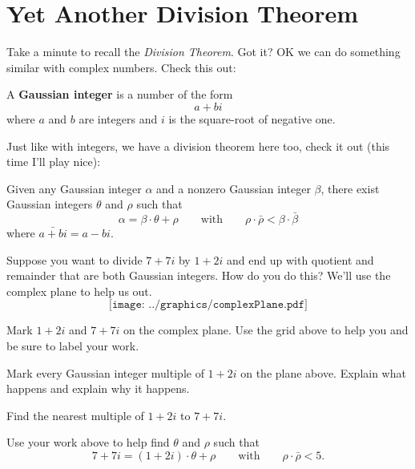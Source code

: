 \newpage
\section{Yet Another Division Theorem}\label{gaussianInt}


Take a minute to recall the \textit{Division Theorem}. Got it? OK we
can do something similar with complex numbers. Check this out:

\begin{definition} 
A \textbf{Gaussian integer} is a number of the form
\[
a + bi
\]
where $a$ and $b$ are integers and $i$ is the square-root of negative
one.
\end{definition}

Just like with integers, we have a division theorem here too, check it
out (this time I'll play nice):

\begin{theorem}
Given any Gaussian integer $\alpha$ and a nonzero Gaussian integer
$\beta$, there exist Gaussian integers $\theta$ and $\rho$ such that
\[
\alpha = \beta \cdot \theta + \rho \qquad \text{with}\qquad 
\rho\cdot\bar{\rho} <  \beta\cdot\bar{\beta}
\]
where $\bar{a + bi} = a - bi$.
\end{theorem}

Suppose you want to divide $7+7i$ by $1+2i$ and end up with quotient
and remainder that are both Gaussian integers. How do you do this?
We'll use the complex plane to help us out.
\[
\texttt{[image: ../graphics/complexPlane.pdf]}
\]
\begin{prob} 
Mark $1+2i$ and $7 +7i$ on the complex plane. Use the grid above to
help you and be sure to label your work.
\end{prob}

\begin{prob}
Mark every Gaussian integer multiple of $1+2i$ on the plane
above. Explain what happens and explain why it happens.
\end{prob}


\begin{prob} 
Find the nearest multiple of $1+2i$ to $7+7i$.
\end{prob}

\begin{prob}
Use your work above to help find $\theta$ and $\rho$ such that
\[
7 + 7i  = (1+2i)\cdot \theta + \rho \qquad \text{with}\qquad 
\rho\cdot\bar{\rho} <  5.
\]
\end{prob}

